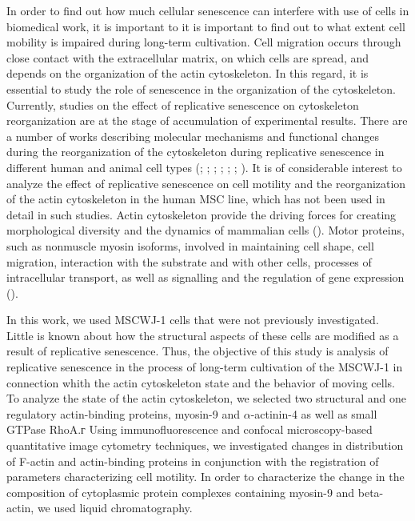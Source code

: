 \documentclass[alpha-refs]{wiley-article}
\begin{document}
In order to find out how much cellular senescence can interfere with use of cells in biomedical work, it is important to  it is important to find out to what extent cell mobility is impaired during long-term cultivation.
Cell migration occurs through close contact with the extracellular matrix, on which cells are spread, and depends on the organization of the actin cytoskeleton.
In this regard, it is essential to study the role of senescence in the organization of the cytoskeleton.
Currently, studies on the effect of replicative senescence on cytoskeleton reorganization are at the stage of accumulation of experimental results.
There are a number of works describing molecular mechanisms and functional changes during the reorganization of the cytoskeleton during replicative senescence in different human and animal cell types (\cite{larsen2003phosphatases}; \cite{le2008regulation}; \cite{wang2009protein}; \cite{geissler2012functional}; \cite{ozcan2016unbiased}; \cite{turinetto2016senescence}; \cite{moujaber2019cellular}).
It is of considerable interest to analyze the effect of replicative senescence on cell motility and the reorganization of the actin cytoskeleton in the human MSC line, which has not been used in detail in such studies.
Actin cytoskeleton provide the driving forces for creating morphological diversity and the dynamics of mammalian cells (\cite{vasiliev1991polarization}).
Motor proteins, such as nonmuscle myosin isoforms, involved in maintaining cell shape, cell migration, interaction with the substrate and with other cells, processes of intracellular transport, as well as signalling and the regulation of gene expression (\cite{omelchenko2002mechanisms}).

In this work, we used MSCWJ-1 cells that were not previously investigated.
Little is known about how the structural aspects of these cells are modified as a result of replicative senescence.
Thus, the objective of this study is analysis of replicative senescence in the process of long-term cultivation of the MSCWJ-1 in connection whith the actin cytoskeleton state and the behavior of moving cells.
To analyze the state of the actin cytoskeleton, we selected two structural and one regulatory actin-binding proteins, myosin-9 and $\alpha$-actinin-4 as well as small GTPase RhoA.г
Using immunofluorescence and confocal microscopy-based quantitative image cytometry techniques, we investigated changes in distribution of F-actin and actin-binding proteins  in conjunction with the registration of parameters characterizing cell motility.
In order to characterize the change in the composition of cytoplasmic protein complexes containing myosin-9 and beta-actin, we used liquid chromatography.
\end{document}
